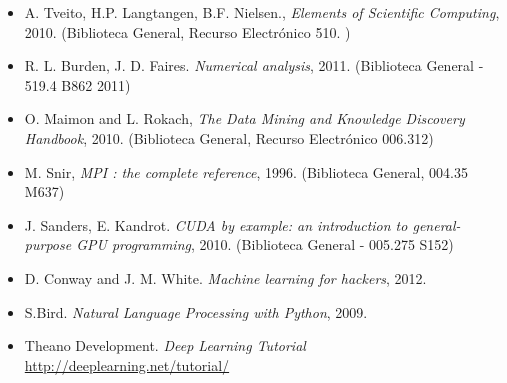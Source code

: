 \documentclass[letterpaper,10pt,onecolumn]{article}
\begin{document}
\begin{itemize}
\item A. Tveito, H.P. Langtangen, B.F. Nielsen., \textit{Elements of
  Scientific Computing}, 2010.  (Biblioteca General, Recurso
  Electr\'onico 510. )\\[-0.6cm] 
\item R. L. Burden, J. D. Faires. \textit{Numerical analysis},
  2011. (Biblioteca General - 519.4 B862 2011)\\[-0.6cm]
\item O. Maimon and L. Rokach, \textit{The Data Mining and Knowledge
  Discovery Handbook}, 2010. (Biblioteca General, Recurso
  Electr\'onico 006.312)\\[-0.6cm]
\item M. Snir, \textit{MPI : the complete reference},
  1996. (Biblioteca General, 004.35 M637)\\[-0.6cm]
\item J. Sanders, E. Kandrot. \textit{CUDA by example: an
  introduction to general-purpose GPU programming}, 2010. (Biblioteca
  General - 005.275 S152)\\[-0.6cm]
\item D. Conway and J. M. White. \textit{Machine learning for
    hackers}, 2012.\\[-0.6cm]
\item S.Bird. \textit{Natural Language Processing with
  Python}, 2009.\\[-0.6cm]
\item Theano Development. \textit{Deep Learning Tutorial}
  \url{http://deeplearning.net/tutorial/}  \\[-0.2cm]
\end{itemize}
\end{document}
